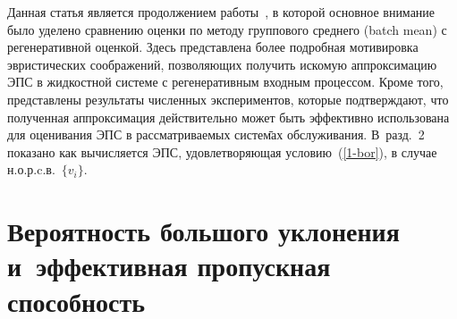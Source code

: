 \begin{multicols}{2}
Данная статья является  продолжением работы~\cite{KRC}, в которой
основное внимание было уделено сравнению оценки по методу группового
среднего (batch mean) с регенеративной оценкой. Здесь представ\-ле\-на
более подробная мотивировка эвристических соображений, позволяющих
получить искомую аппроксимацию ЭПС   в жидкостной сис\-те\-ме  с
регенеративным входным процессом. Кроме того, представлены
результаты  численных экспериментов, которые подтверждают, что
полученная аппроксимация действительно может быть эффективно
использована для оценивания ЭПС в рассматриваемых сис\-те\=мах
обслуживания. В~разд.~2 показано как вычисляется  ЭПС,
удовлетворяющая условию~(\ref{1-bor}), в случае н.о.р.c.в.\
$\{v_i\}$.

\section{Вероятность большого уклонения и~эффективная пропускная способность}


\end{multicols}

